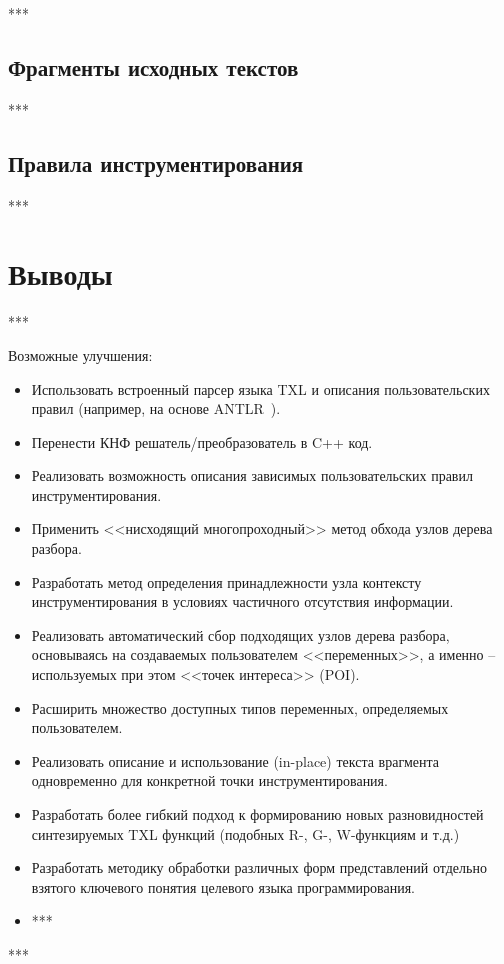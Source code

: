 ***

\subsection{Фрагменты исходных текстов}

***

\subsection{Правила инструментирования}

***

\section{Выводы}

***

Возможные улучшения:

\begin{itemize}[noitemsep]
  \item Использовать встроенный парсер языка TXL и описания пользовательских правил (например, на основе ANTLR~\cite{antlr}).
  \item Перенести КНФ решатель/преобразователь в C++ код.
  \item Реализовать возможность описания зависимых пользовательских правил инструментирования.
  \item Применить <<нисходящий многопроходный>> метод обхода узлов дерева разбора.
  \item Разработать метод определения принадлежности узла контексту инструментирования в условиях частичного отсутствия информации.
  \item Реализовать автоматический сбор подходящих узлов дерева разбора, основываясь на создаваемых пользователем <<переменных>>, а именно -- используемых при этом <<точек интереса>> (POI).
  \item Расширить множество доступных типов переменных, определяемых пользователем.
  \item Реализовать описание и использование (in-place) текста врагмента одновременно для конкретной точки инструментирования.
  \item Разработать более гибкий подход к формированию новых разновидностей синтезируемых TXL функций (подобных R-, G-, W-функциям и т.д.)
  \item Разработать методику обработки различных форм представлений отдельно взятого ключевого понятия целевого языка программирования.
  \item ***
\end{itemize}

***
